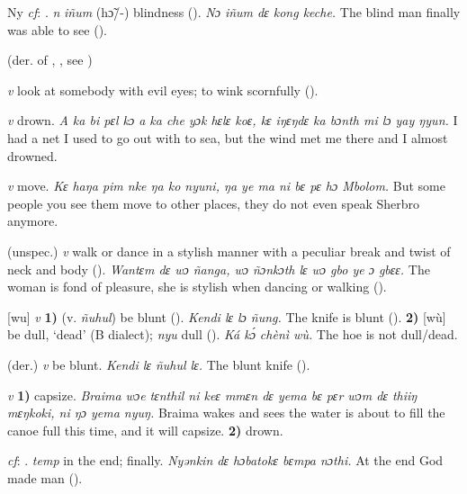 \begin{letter}{Ny}
 \textit{cf}: . \textit{n} \textit{iñum} (hɔ̃/-) blindness (\citealt{Pichl1967}). \textit{Nɔ iñum dɛ kong keche.} The blind man finally was able to see (\citealt{Pichl1967}). 

 (der. of , , see ) 

 \textit{v} look at somebody with evil eyes; to wink scornfully (\citealt{Pichl1967}).

 \textit{v} drown. \textit{A ka bi pɛl kɔ a ka che yɔk hɛlɛ koɛ, kɛ iŋɛŋdɛ ka bɔnth mi lɔ yay ŋyun.} I had a net I used to go out with to sea, but the wind met me there and I almost drowned.

 \textit{v} move. \textit{Kɛ haŋa pim nke ŋa ko nyuni, ŋa ye ma ni bɛ pɛ hɔ Mbolom.} But some people you see them move to other places, they do not even speak Sherbro anymore.

 (unspec.) \textit{v} walk or dance in a stylish manner with a peculiar break and twist of neck and body (\citealt{Pichl1967}). \textit{Wantɛm dɛ wɔ ñanga, wɔ ñɔnkɔth lɛ wɔ gbo ye ɔ gbɛɛ.} The woman is fond of pleasure, she is stylish when dancing or walking (\citealt{Pichl1967}). 

 [wu] \textit{v} \textbf{1)} (v. \textit{ñuhul}) be blunt (\citealt{Pichl1967}). \textit{Kendi lɛ lɔ ñung.} The knife is blunt (\citealt{Pichl1967}). \textbf{2)} [wù] be dull, ‘dead' (B dialect); \textit{nyu} dull (\citealt{Sumner1921}). \textit{Ká kɔ́ chènì wù.} The hoe is not dull/dead.

 (der.) \textit{v} be blunt. \textit{Kendi lɛ ñuhul lɛ.} The blunt knife (\citealt{Pichl1967}).

 \textit{v} \textbf{1)} capsize. \textit{Braima wɔe tɛnthil ni keɛ mmɛn dɛ yema bɛ pɛr wɔm dɛ thiiŋ mɛŋkoki, ni ŋɔ yema nyuŋ.} Braima wakes and sees the water is about to fill the canoe full this time, and it will capsize. \textbf{2)} drown.

 \textit{cf}: . \textit{temp} in the end; finally. \textit{Nyənkin dɛ hɔbatokɛ bɛmpa nɔthi.} At the end God made man (\citealt{Pichl1967}). 


\end{letter}
